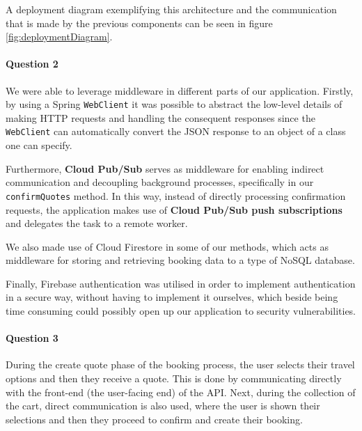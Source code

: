 \documentclass{ds-report}
\begin{document}
A deployment diagram exemplifying this architecture and the communication that is made by the previous components can be seen in figure \ref{fig:deploymentDiagram}.


    \paragraph{Question 2} 
    We were able to leverage middleware in different parts of our application. Firstly, by using a Spring \texttt{WebClient} it was possible to abstract the low-level details of making HTTP requests and handling the consequent responses since the \texttt{WebClient} can automatically convert the JSON response to an object of a class one can specify.

    Furthermore, \textbf{Cloud Pub/Sub} serves as middleware for enabling indirect communication and decoupling background processes, specifically in our \texttt{confirmQuotes} method. In this way, instead of directly processing confirmation requests, the application makes use of \textbf{Cloud Pub/Sub push subscriptions} and delegates the task to a remote worker.

    We also made use of Cloud Firestore in some of our methods, which acts as middleware for storing and retrieving booking data to a type of NoSQL database. 
    
    Finally, Firebase authentication was utilised in order to implement authentication in a secure way, without having to implement it ourselves, which beside being time consuming could possibly open up our application to security vulnerabilities.

    \paragraph{Question 3}

    During the create quote phase of the booking process, the user selects their travel options and then they receive a quote. This is done by communicating directly with the front-end (the user-facing end) of the API. Next, during the collection of the cart, direct communication is also used, where the user is shown their selections and then they proceed to confirm and create their booking.
\end{document}
